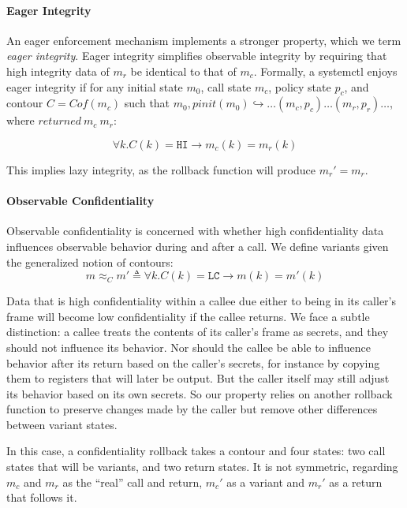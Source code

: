 \documentclass{article}
\begin{document}
    \paragraph{Eager Integrity}
 
      An eager enforcement mechanism implements a stronger property, which we term {\it eager integrity}.
      Eager integrity simplifies observable integrity by requiring that high integrity data of \(m_r\) be
      identical to that of \(m_c\). Formally, a systemctl enjoys eager integrity if for any initial state
      \(m_0\), call state \(m_c\), policy state \(p_c\), and contour \(C = Cof(m_c)\) such that
      \(m_0,\mathit{pinit}(m_0) \hookrightarrow \dots (m_c,p_c) \dots (m_r,p_r) \dots\), where \(\mathit{returned}\ m_c\ m_r\):

      \[\forall k . C(k) = \mathtt{HI} \rightarrow m_c(k) = m_r(k)\]

      This implies lazy integrity, as the rollback function will produce \(m_r' = m_r\).
 
    \paragraph{Observable Confidentiality}

      Observable confidentiality is concerned with whether high confidentiality data influences
      observable behavior during and after a call. We define variants given the generalized notion
      of contours:
      \[m \approx_C m' \triangleq \forall k . C(k) = \mathtt{LC} \rightarrow m(k) = m'(k)\]

      Data that is high confidentiality within a callee due either to being in its caller's frame
      will become low confidentiality if the callee returns. We face a subtle distinction: 
      a callee treats the contents of its caller's frame as secrets, and they should not influence
      its behavior. Nor should the callee be able to influence behavior after its return based
      on the caller's secrets, for instance by copying them to registers that will later be output.
      But the caller itself may still adjust its behavior based on its own secrets. So our property
      relies on another rollback function to preserve changes made by the caller but remove other
      differences between variant states.

      In this case, a confidentiality rollback takes a contour and four states: two call states
      that will be variants, and two return states. It is not symmetric, regarding \(m_c\) and \(m_r\)
      as the ``real'' call and return, \(m_c'\) as a variant and \(m_r'\) as a return that follows it.
\end{document}
